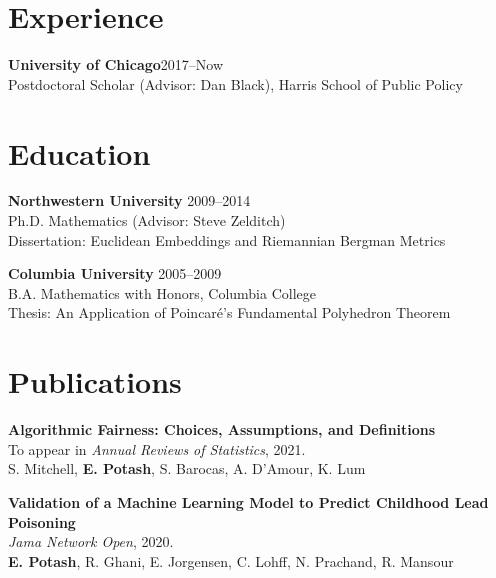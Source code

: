 \documentclass[margin,line]{resume}
\begin{document}
\address{epotash@uchicago.edu / \href{http://www.k2co3.net}{k2co3.net} / \href{https://github.com/potash}{github.com/potash}}
\begin{resume}
\section{\mysidestyle Experience}
	{\bf University of Chicago}\hfill{2017--Now}\\
	Postdoctoral Scholar (Advisor: Dan Black), Harris School of Public Policy

    \section{\mysidestyle Education}
	
	{\bf Northwestern University} \hfill {2009--2014} \\%
	Ph.D. Mathematics (Advisor: Steve Zelditch) \\
	Dissertation: Euclidean Embeddings and Riemannian Bergman Metrics

	{\bf Columbia University} \hfill {2005--2009} \\%
    B.A. Mathematics with Honors, Columbia College \\
	Thesis: An Application of Poincar\'e's Fundamental Polyhedron Theorem

	
	\section{\mysidestyle Publications}
        {\bf Algorithmic Fairness: Choices, Assumptions, and Definitions}\\
        To appear in \textit{Annual Reviews of Statistics}, 2021.\\
        S. Mitchell, \textbf{E. Potash}, S. Barocas, A. D'Amour, K. Lum

        {\bf Validation of a Machine Learning Model to Predict Childhood Lead \\ Poisoning}\\
        \textit{Jama Network Open}, 2020.\\
        \textbf{E. Potash}, R. Ghani, E. Jorgensen, C. Lohff, N. Prachand, R. Mansour


\end{resume}
\end{document}
